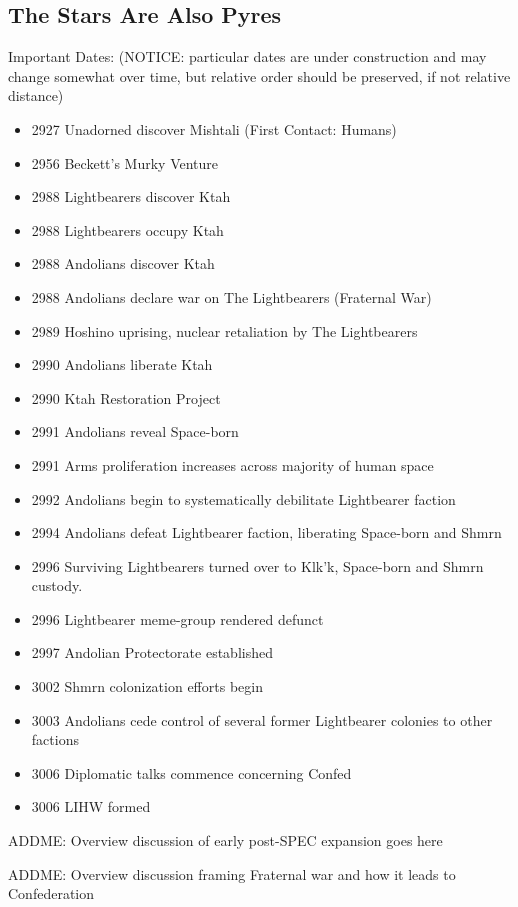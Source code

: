 \subsection{The Stars Are Also Pyres}
Important Dates: (NOTICE: particular dates are under construction and may change somewhat over time, but relative order should be preserved, if not relative distance)
\begin{itemize}
\item 2927 Unadorned discover Mishtali (First Contact: Humans)
\item 2956 Beckett's Murky Venture
\item 2988 Lightbearers discover Ktah
\item 2988 Lightbearers occupy Ktah
\item 2988 Andolians discover Ktah
\item 2988 Andolians declare war on The Lightbearers (Fraternal War)
\item 2989 Hoshino uprising, nuclear retaliation by The Lightbearers
\item 2990 Andolians liberate Ktah
\item 2990 Ktah Restoration Project
\item 2991 Andolians reveal Space-born
\item 2991 Arms proliferation increases across majority of human space
\item 2992 Andolians begin to systematically debilitate Lightbearer faction
\item 2994 Andolians defeat Lightbearer faction, liberating Space-born and Shmrn
\item 2996 Surviving Lightbearers turned over to Klk'k, Space-born and Shmrn custody.
\item 2996 Lightbearer meme-group rendered defunct
\item 2997 Andolian Protectorate established
\item 3002 Shmrn colonization efforts begin
\item 3003 Andolians cede control of several former Lightbearer colonies to other factions
\item 3006 Diplomatic talks commence concerning Confed
\item 3006 LIHW formed
\end{itemize}

ADDME: Overview discussion of early post-SPEC expansion goes here

ADDME: Overview discussion framing Fraternal war and how it leads to Confederation

